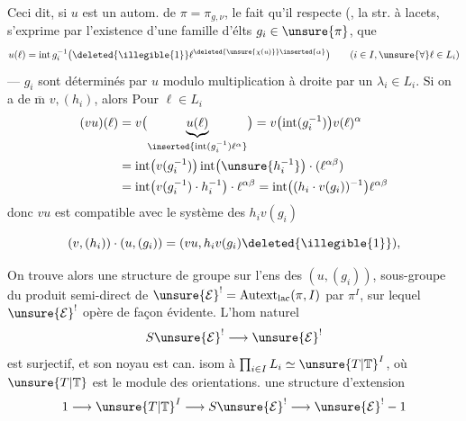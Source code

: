 Ceci dit, si $u$ est un autom. de $\pi=\pi_{g,\nu}$, le fait qu'il respecte (,  la str. à lacets, s'exprime par l'existence d'une famille d'élts $g_i\in\unsure{\pi}$,  que
\[
u(\ell)=\operatorname{int}g_i^{-1}\bigl(\deleted{\illegible{1}}\ell^{\deleted{\unsure{\chi(u)}}\inserted{\alpha}}\bigr)
\qquad(i\in I,\unsure{\forall}\ell\in L_i)
\]
---  $g_i$ sont déterminés par $u$  modulo multiplication à droite par un $\lambda_i\in L_i$. Si on a de $\overline{\mathrm m}$ $v,(h_i)$, alors  Pour $\ell\in L_i$ 
\[
\begin{aligned}
(vu)(\ell)
&=v\bigl(\underbrace{u(\ell)}_{\inserted{\operatorname{int}(g_i^{-1})\ell^{\alpha}}}\bigr)
=v\bigl(\operatorname{int}(g_i^{-1})\bigr)v(\ell)^{\alpha}\\
&=\operatorname{int}\bigl(v(g_i^{-1})\bigr)\operatorname{int}\bigl(\unsure{h_i^{-1}}\bigr)\cdot(\ell^{\alpha\beta})\\
&=\operatorname{int}\bigl(v(g_i^{-1})\cdot h_i^{-1}\bigr)\cdot\ell^{\alpha\beta}
=\operatorname{int}\bigl((h_i\cdot v(g_i))^{-1}\bigr)\ell^{\alpha\beta}
\end{aligned}
\]
donc $vu$ est compatible avec le système des  $h_i v(g_i)$ 


\[
(v,(h_i))\cdot(u,(g_i))=(vu,h_i v(g_i)\deleted{\illegible{1}}),
\]

On trouve alors une structure de groupe sur l'ens  des $(u,(g_i))$, sous-groupe du produit semi-direct de $\unsure{\mathcal E}^{!}=\mathrm{Autext}_{\mathrm{lac}}(\pi,I)$  par $\pi^I$, sur lequel $\unsure{\mathcal E}^{!}$ opère de façon évidente. L'hom naturel
\[
S\unsure{\mathcal E}^{!}\longrightarrow\unsure{\mathcal E}^{!}
\]
est surjectif, et son noyau est can. isom à $\prod_{i\in I} L_i\simeq \unsure{T|\mathbb T}^I$, où $\unsure{T|\mathbb T}$ est le module des orientations.
 une structure d'extension 
\[
1\longrightarrow \unsure{T|\mathbb T}^I\longrightarrow S\unsure{\mathcal E}^{!}\longrightarrow\unsure{\mathcal E}^{!}-1
\]

